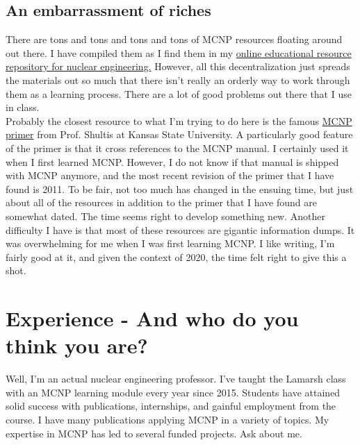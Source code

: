 \documentclass[11pt,a4paper]{article}
\begin{document}
\subsection{An embarrassment of riches}
\noindent There are tons and tons and tons and tons of MCNP resources floating around out there. I have compiled them as I find them in my \href{https://courses.lumenlearning.com/uidaho-nuclear/}{online educational resource repository for nuclear engineering.} However, all this decentralization just spreads the materials out so much that there isn't really an orderly way to work through them as a learning process. There are a lot of good problems out there that I use in class. \\

\noindent Probably the closest resource to what I'm trying to do here is the famous \href{https://www.mne.k-state.edu/~jks/MCNPprmr.pdf}{MCNP primer} from Prof. Shultis at Kansas State University. A particularly good feature of the primer is that it cross references to the MCNP manual. I certainly used it when I first learned MCNP. However, I do not know if that manual is shipped with MCNP anymore, and the most recent revision of the primer that I have found is 2011. To be fair, not too much has changed in the ensuing time, but just about all of the resources in addition to the primer that I have found are somewhat dated. The time seems right to develop something new. Another difficulty I have is that most of these resources are gigantic information dumps. It was overwhelming for me when I was first learning MCNP. I like writing, I'm fairly good at it, and given the context of 2020, the time felt right to give this a shot. \\

\newpage


\section{Experience - And who do you think you are?} \label{experience}
\noindent Well, I'm an actual nuclear engineering professor. I've taught the Lamarsh class with an MCNP learning module every year since 2015. Students have attained solid success with publications, internships, and gainful employment from the course. I have many publications applying MCNP in a variety of topics. My expertise in MCNP has led to several funded projects. Ask about me. \\
\end{document}
